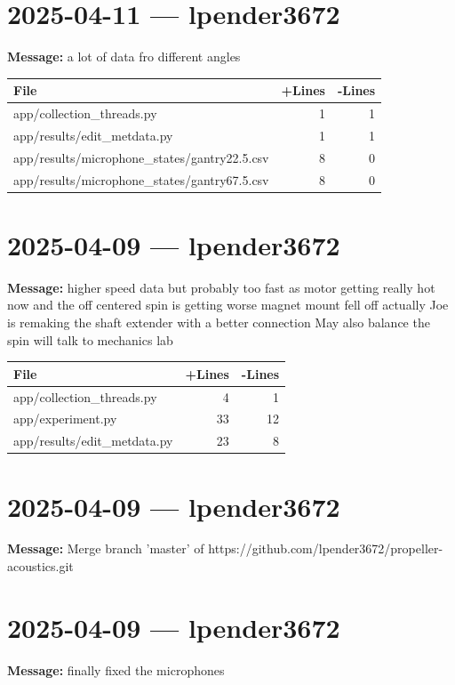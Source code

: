 \documentclass{article}
\begin{document}
\section*{2025-04-11 --- lpender3672}
\textbf{Message:} a lot of data fro different angles

\begin{longtable}{|p{10cm}|r|r|}
\hline \textbf{File} & \textbf{+Lines} & \textbf{-Lines} \\
\hline
app/collection\_threads.py & 1 & 1 \\
\hline
app/results/edit\_metdata.py & 1 & 1 \\
\hline
app/results/microphone\_states/gantry22.5.csv & 8 & 0 \\
\hline
app/results/microphone\_states/gantry67.5.csv & 8 & 0 \\
\hline
\end{longtable}

\section*{2025-04-09 --- lpender3672}
\textbf{Message:} higher speed data but probably too fast as motor getting really hot now and the off centered spin is getting worse magnet mount fell off actually Joe is remaking the shaft extender with a better connection May also balance the spin will talk to mechanics lab

\begin{longtable}{|p{10cm}|r|r|}
\hline \textbf{File} & \textbf{+Lines} & \textbf{-Lines} \\
\hline
app/collection\_threads.py & 4 & 1 \\
\hline
app/experiment.py & 33 & 12 \\
\hline
app/results/edit\_metdata.py & 23 & 8 \\
\hline
\end{longtable}

\section*{2025-04-09 --- lpender3672}
\textbf{Message:} Merge branch 'master' of https://github.com/lpender3672/propeller-acoustics.git

\section*{2025-04-09 --- lpender3672}
\textbf{Message:} finally fixed the microphones
\end{document}
